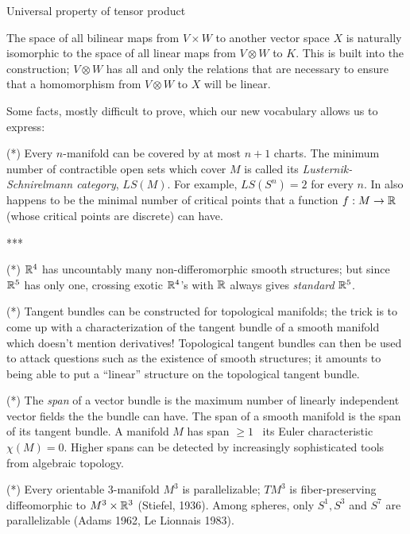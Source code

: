 Universal property of tensor product

The space of all bilinear maps from $V\times W$ to another vector space $X$ is naturally 
isomorphic to the space of all linear maps from $V \otimes W$ to $K$. This is built 
into the construction; $V\otimes W$ has all and only the relations that are necessary 
to ensure that a homomorphism from $V\otimes W$ to $X$ will be linear.

\bsk

\noindent Some facts, mostly difficult to prove, which our new vocabulary allows us to express:

\msk

\noindent (*) Every $n$-manifold can be covered by at most $n+1$ charts. The minimum number of contractible 
open sets which cover $M$ is
called its {\it Lusternik-Schnirelmann category}, $LS(M)$. For example, $LS(S^n)=2$ for every $n$.
In also happens to be the minimal number of critical points that a function $f:M\rightarrow {\Bbb R}$
(whose critical points are discrete) can have.

***

\ssk

\noindent (*) ${\Bbb R}^4$ has uncountably many non-differomorphic smooth structures; but since ${\Bbb R}^5$
has only one, crossing exotic ${\Bbb R}^4$'s with ${\Bbb R}$ always gives {\it standard} ${\Bbb R}^5$.

\ssk

\noindent (*) Tangent bundles can be constructed for topological manifolds; the trick is to come up
with a characterization of the tangent bundle of a smooth manifold which doesn't mention
derivatives! Topological tangent bundles can then be used to attack questions such as
the existence of smooth structures; it amounts to being able to put a ``linear'' 
structure on the topological tangent bundle. 

\ssk

\noindent (*) The {\it span} of a vector bundle is the maximum number of linearly independent vector fields
the the bundle can have. The span of a smooth manifold is the span of its tangent bundle.
A manifold $M$ has span $\geq 1$ \lra\ its Euler characteristic $\chi(M)=0$. Higher spans can
be detected by increasingly sophisticated tools from algebraic topology.

\ssk

\noindent (*) Every orientable $3$-manifold $M^3$ is parallelizable; $TM^3$ is fiber-preserving diffeomorphic to
$M^3\times {\Bbb R}^3$ (Stiefel, 1936). Among spheres, only $S^1,S^3$ and $S^7$ are parallelizable
(Adams 1962, Le Lionnais 1983).

